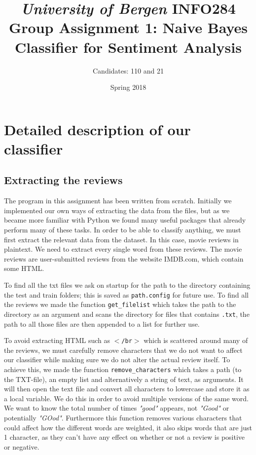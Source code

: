 \documentclass[a4paper,12pt]{article}
\title{\textit{University of Bergen}
\linebreak{}
\textbf{INFO284}
\linebreak{}
\linebreak{}
Group Assignment 1:
\linebreak{}
Naive Bayes Classifier for Sentiment Analysis}
\author{Candidates: 110 and 21}
\date{Spring 2018}
\begin{document}
\begin{titlingpage}
\maketitle
\tableofcontents
\end{titlingpage}

\hypersetup{linkcolor = midnightblue}

\section{Detailed description of our classifier}

\subsection{Extracting the reviews}
The program in this assignment has been written from scratch. Initially we implemented our own ways of extracting the data from the files, but as we became more familiar with Python we found many useful packages that already perform many of these tasks. In order to be able to classify anything, we must first extract the relevant data from the dataset. In this case, movie reviews in plaintext. We need to extract every single word from these reviews. The movie reviews are user-submitted reviews from the website IMDB.com, which contain some HTML. 

To find all the txt files we ask on startup for the path to the directory containing the test and train folders; this is saved as \texttt{path.config} for future use. To find all the reviews we made the function \texttt{get\_filelist} which takes the path to the directory as an argument and scans the directory for files that contains \texttt{.txt}, the path to all those files are then appended to a list for further use.

To avoid extracting HTML such as \texttt{$<$/br$>$} which is scattered around many of the reviews, we must carefully remove characters that we do not want to affect our classifier while making sure we do not alter the actual review itself. To achieve this, we made the function \texttt{remove\_characters} which takes a path (to the TXT-file), an empty list and alternatively a string of text, as arguments. It will then open the text file and convert all characters to lowercase and store it as a local variable. We do this in order to avoid multiple versions of the same word. We want to know the total number of times \textit{"good"} appears, not \textit{"Good"} or potentially \textit{"GOod"}. Furthermore this function removes various characters that could affect how the different words are weighted, it also skips words that are just 1 character, as they can't have any effect on whether or not a review is positive or negative.
\end{document}
